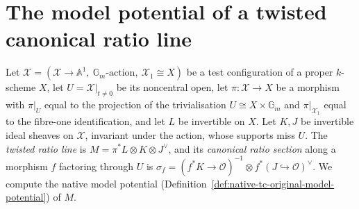 \section{The model potential of a twisted canonical ratio line}

Let $\mathcal X=(\mathcal X\to\mathbb A^1,\ \mathbb G_m\text{-action},\
\mathcal X_1\cong X)$ be a test configuration of a proper $k$-scheme $X$, let
$U=\mathcal X|_{t\neq0}$ be its noncentral open, let $\pi:\mathcal X\to X$ be
a morphism with $\pi|_U$ equal to the projection of the trivialisation
$U\cong X\times\mathbb G_m$ and $\pi|_{\mathcal X_1}$ equal to the fibre-one
identification, and let $L$ be invertible on $X$.  Let $K,J$ be invertible
ideal sheaves on $\mathcal X$, invariant under the action, whose supports miss
$U$.  The \emph{twisted ratio line} is
$M=\pi^*L\otimes K\otimes J^\vee$, and its \emph{canonical ratio section}
along a morphism $f$ factoring through $U$ is
$\sigma_f=(f^*K\to\mathcal O)^{-1}\otimes f^*(J\hookrightarrow\mathcal O)^\vee$.
We compute the native model potential (Definition~\ref{def:native-tc-original-model-potential})
of $M$.

